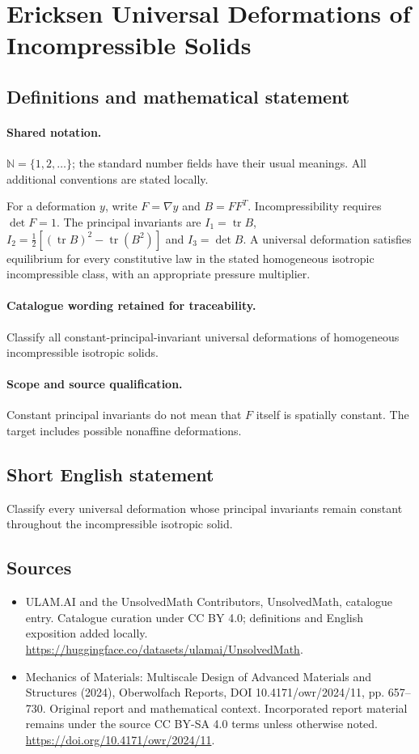 \documentclass[11pt]{article}
\begin{document}
\section{Ericksen Universal Deformations of Incompressible Solids}\label{statement}

\subsection{Definitions and mathematical statement}

\paragraph{Shared notation.}$\mathbb N=\{1,2,\ldots\}$; the standard number fields have their usual meanings. All additional conventions are stated locally.


For a deformation $y$, write $F=\nabla y$ and $B=FF^T$. Incompressibility requires $\det F=1$. The principal invariants are $I_1=\operatorname{tr}B$, $I_2=\tfrac12[(\operatorname{tr}B)^2-\operatorname{tr}(B^2)]$ and $I_3=\det B$. A universal deformation satisfies equilibrium for every constitutive law in the stated homogeneous isotropic incompressible class, with an appropriate pressure multiplier.

\paragraph{Catalogue wording retained for traceability.}
Classify all constant-principal-invariant universal deformations of homogeneous incompressible isotropic solids.

\paragraph{Scope and source qualification.}Constant principal invariants do not mean that $F$ itself is spatially constant. The target includes possible nonaffine deformations.
\subsection{Short English statement}
Classify every universal deformation whose principal invariants remain constant throughout the incompressible isotropic solid.
\subsection{Sources}
\begin{itemize}
\item[\hypertarget{source:statement:1}{S1}] ULAM.AI and the UnsolvedMath Contributors, UnsolvedMath, catalogue entry. Catalogue curation under CC BY 4.0; definitions and English exposition added locally.
\url{https://huggingface.co/datasets/ulamai/UnsolvedMath}.
\item[\hypertarget{source:statement:2}{S2}] Mechanics of Materials: Multiscale Design of Advanced Materials and Structures (2024), Oberwolfach Reports, DOI 10.4171/owr/2024/11, pp. 657--730. Original report and mathematical context. Incorporated report material remains under the source CC BY-SA 4.0 terms unless otherwise noted.
\url{https://doi.org/10.4171/owr/2024/11}.
\end{itemize}
\label{end:statement}
\end{document}
